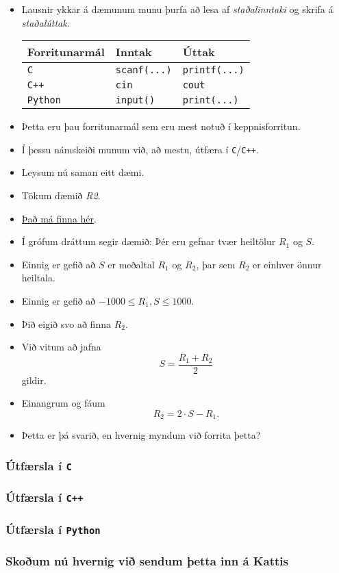 \documentclass[handout]{beamer}
\newcommand\env[2]
{
	\begin{#1}
	#2
	\end{#1}
}
\newcommand\code[1]{\tiny}
\begin{document}
\env{frame}
{
	\env{itemize}
	{
		\item<1-> Lausnir ykkar á dæmunum munu þurfa að lesa af \emph{staðalinntaki} og skrifa á \emph{staðalúttak}.
		\pause

		\begin{tabular}{l l l}
			Forritunarmál & Inntak & Úttak\\
			\hline
			\texttt{C} & \texttt{scanf(...)} & \texttt{printf(...)}\\
			\texttt{C++} & \texttt{cin} & \texttt{cout}\\
			\texttt{Python} & \texttt{input()} & \texttt{print(...)}
		\end{tabular}

		\item<3-> Þetta eru þau forritunarmál sem eru mest notuð í keppnisforritun.
		\item<4-> Í þessu námskeiði munum við, að mestu, útfæra í \texttt{C}/\texttt{C++}.
		\item<5-> Leysum nú saman eitt dæmi.
	}
}

\env{frame}
{
	\env{itemize}
	{
		\item<1-> Tökum dæmið \emph{R2}.
		\item<2-> \href{https://hi.kattis.com/problems/r2}{Það má finna hér}.
		\item<3-> Í grófum dráttum segir dæmið: Þér eru gefnar tvær heiltölur $R_1$ og $S$.
		\item<4-> Einnig er gefið að $S$ er meðaltal $R_1$ og $R_2$, þar sem $R_2$ er einhver önnur heiltala.
		\item<5-> Einnig er gefið að $-1000 \leq R_1, S \leq 1000$.
		\item<6-> Þið eigið svo að finna $R_2$.
	}
}

\env{frame}
{
	\env{itemize}
	{
		\item<1-> Við vitum að jafna
		\[
			S = \frac{R_1 + R_2}{2}
		\]
		gildir.
		\item<2-> Einangrum og fáum
		\[
			R_2 = 2 \cdot S - R_1.
		\]
		\item<3-> Þetta er þá svarið, en hvernig myndum við forrita þetta?
	}
}

\env{frame}
{
	\frametitle{Útfærsla í \texttt{C}}
	\code{r2.c}
}

\env{frame}
{
	\frametitle{Útfærsla í \texttt{C++}}
	\code{r2.cpp}
}

\env{frame}
{
	\frametitle{Útfærsla í \texttt{Python}}
	\code{r2.py}
}

\env{frame}
{
	\frametitle{Skoðum nú hvernig við sendum þetta inn á Kattis}
}
\end{document}
